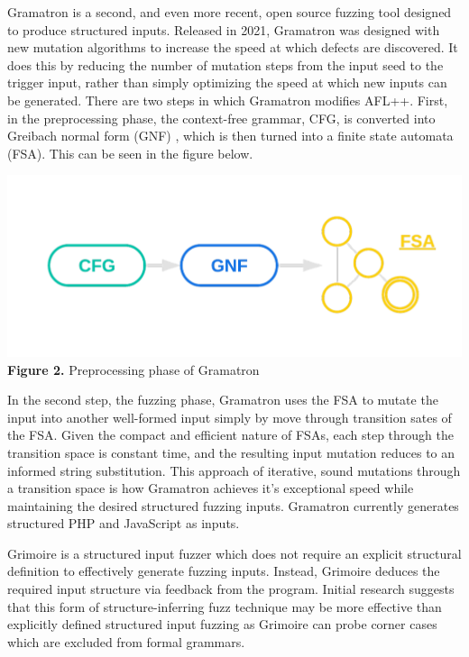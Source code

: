 \documentclass[12pt]{diazessay}
\begin{document}
\clearpage

Gramatron\cite{srivastava2021gramatron} is a second, and even more recent, open source fuzzing tool designed to produce structured inputs.
Released in 2021, Gramatron was designed with new mutation algorithms to increase the speed at which defects are discovered.
It does this by reducing the number of mutation steps from the input seed to the trigger input, rather than simply optimizing the speed at which new inputs can be generated. There are two steps in which Gramatron modifies AFL++. First, in the preprocessing phase, the context-free grammar, CFG, is converted into Greibach normal form (GNF) \cite{greibach1965new}, which is then turned into a finite state automata (FSA). This can be seen in the figure below.

\vspace{-1cm}
\begin{center}
	\includegraphics[scale=0.4, trim={0 3cm 0 0}, clip]{gramatronfig.png}
	\textbf{Figure 2.} Preprocessing phase of Gramatron
\end{center}
\vspace{6mm}

In the second step, the fuzzing phase, Gramatron uses the FSA to mutate the input into another well-formed input simply by move through transition sates of the FSA.
Given the compact and efficient nature of FSAs, each step through the transition space is constant time, and the resulting input mutation reduces to an informed string substitution.
This approach of iterative, sound mutations through a transition space is how Gramatron achieves it's exceptional speed while maintaining the desired structured fuzzing inputs.
Gramatron currently generates structured PHP and JavaScript as inputs.


Grimoire\cite{GRIMOIRE} is a structured input fuzzer which does not require an explicit structural definition to effectively generate fuzzing inputs.
Instead, Grimoire deduces the required input structure via feedback from the program.
Initial research suggests that this form of structure-inferring fuzz technique may be more effective than explicitly defined structured input fuzzing as Grimoire can probe corner cases which are excluded from formal grammars.
\end{document}
